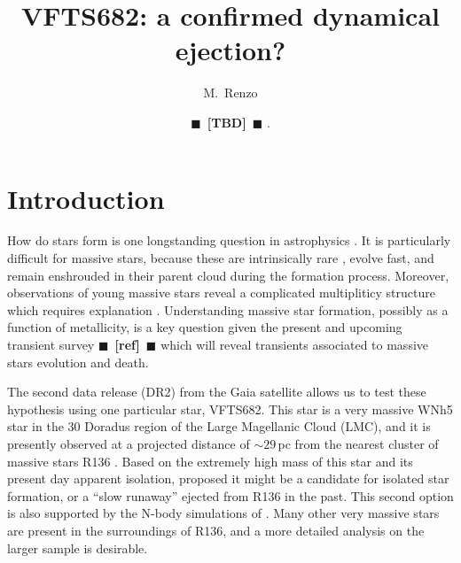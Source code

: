 \documentclass{aa}
\newcommand{\todo}[1]{{\large $\blacksquare$~\textbf{\color{red}[#1]}}~$\blacksquare$}
\begin{document}
\title{VFTS682: a confirmed dynamical ejection?}

\author{M.~Renzo \and \todo{TBD}%
  .} 

  
\date{}
\abstract{}

\maketitle{}

\section{Introduction}
\label{sec:intro}

How do stars form is one longstanding question in astrophysics
\cite{lada:03, zinnecker:07}. It is particularly difficult for massive stars, because these are intrinsically rare
\citep[e.g.,][]{salpeter:55,kroupa:01, schneider:18}, evolve fast, and
remain enshrouded in their parent cloud during the formation
process. Moreover, observations of young massive stars reveal a
complicated multipliticy structure which requires
explanation \citep[][]{kobulnicky:07,mason:09,sana:11,sana:12,kiminki:12,chini:12,kobulnicky:14,almeida:17,demarco:17}. Understanding massive star formation, possibly as a
function of metallicity, is a key question given the present and upcoming
transient survey \citep[e.g., LSST, BlackGem, LIGO/Virgo O3][]{}\todo{ref} which
will reveal transients associated to massive stars
evolution and death.

The second data release (DR2) from the Gaia satellite
\cite[][]{gaia:16,brown:18} allows us to test
these hypothesis using one particular star, VFTS682. 
This star is a
very massive \citep[$M_\mathrm{ZAMS}\simeq150\,M_\odot$,][]{bestenlehner:11,schneider:18} WNh5 star in the 30 Doradus region
of the Large Magellanic Cloud (LMC), and it is presently observed at a
projected distance of $\sim$$29$\,pc from the nearest cluster of
massive stars R136 \citep[][]{bestenlehner:11}. Based on the extremely high mass of this star and
its present day apparent isolation, \cite{bestenlehner:11} proposed it
might be a candidate for isolated star formation, or a ``slow runaway'' ejected
from R136 in the past. This second option is also supported by the
N-body simulations of \cite{fujii:11, banerjee:12}.   Many other
very massive stars are present in the surroundings of R136, and a more
detailed analysis on the larger sample is desirable.
\end{document}

